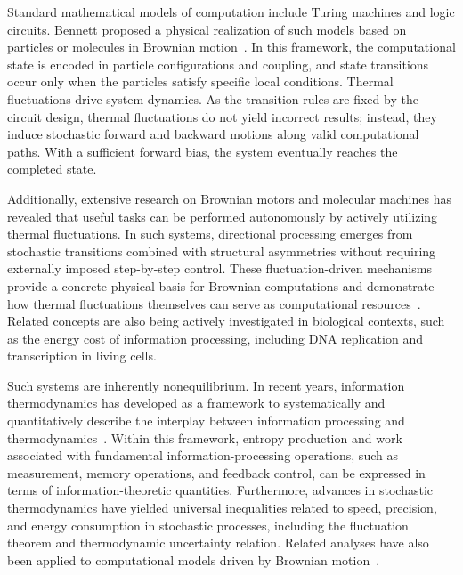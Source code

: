 \documentclass[%
 reprint,
superscriptaddress,
 amsmath,amssymb,
 aps,
 prx,
]{revtex4-2}
\begin{document}
Standard mathematical models of computation include Turing machines and logic circuits. Bennett proposed a physical realization of such models based on particles or molecules in Brownian motion~\cite{bennett_thermodynamics_1982}. In this framework, the computational state is encoded in particle configurations and coupling, and state transitions occur only when the particles satisfy specific local conditions. Thermal fluctuations drive system dynamics. As the transition rules are fixed by the circuit design, thermal fluctuations do not yield incorrect results; instead, they induce stochastic forward and backward motions along valid computational paths. With a sufficient forward bias, the system eventually reaches the completed state.

Additionally, extensive research on Brownian motors and molecular machines has revealed that useful tasks can be performed autonomously by actively utilizing thermal fluctuations. In such systems, directional processing emerges from stochastic transitions combined with structural asymmetries without requiring externally imposed step-by-step control. These fluctuation-driven mechanisms provide a concrete physical basis for Brownian computations and demonstrate how thermal fluctuations themselves can serve as computational resources~\cite{julicher_modeling_1997,astumian_thermodynamics_1997,boyd_identifying_2016,reimann_brownian_2002}. Related concepts are also being actively investigated in biological contexts, such as the energy cost of information processing, including DNA replication and transcription in living cells.

Such systems are inherently nonequilibrium. In recent years, information thermodynamics has developed as a framework to systematically and quantitatively describe the interplay between information processing and thermodynamics~\cite{parrondo_thermodynamics_2015,sagawa_generalized_2010,sagawa_nonequilibrium_2012,sagawa_second_2017,berut_experimental_2012}. Within this framework, entropy production and work associated with fundamental information-processing operations, such as measurement, memory operations, and feedback control, can be expressed in terms of information-theoretic quantities. Furthermore, advances in stochastic thermodynamics have yielded universal inequalities related to speed, precision, and energy consumption in stochastic processes, including the fluctuation theorem and thermodynamic uncertainty relation. Related analyses have also been applied to computational models driven by Brownian motion~\cite{strasberg_thermodynamics_2015,yoshino_thermodynamics_2023,kolchinsky_thermodynamic_2020,wolpert_stochastic_2019,utsumi_computation_2022,utsumi_thermodynamic_2023,utsumi_conservative_2025}.
\end{document}
